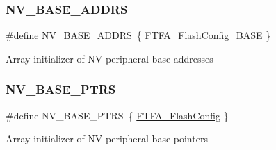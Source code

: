 \subsubsection{\texorpdfstring{NV\_BASE\_ADDRS}{NV\_BASE\_ADDRS}}
{\footnotesize\ttfamily \#define N\+V\+\_\+\+B\+A\+S\+E\+\_\+\+A\+D\+D\+RS~\{ \mbox{\hyperlink{group___n_v___peripheral___access___layer_ga1e6dbd99b75dd6c501dddbdbc8141ea7}{F\+T\+F\+A\+\_\+\+Flash\+Config\+\_\+\+B\+A\+SE}} \}}

Array initializer of NV peripheral base addresses \mbox{\label{group___n_v___peripheral___access___layer_ga1e44e66a8945b675dcebb6fbd6bdc85b}} 
\subsubsection{\texorpdfstring{NV\_BASE\_PTRS}{NV\_BASE\_PTRS}}
{\footnotesize\ttfamily \#define N\+V\+\_\+\+B\+A\+S\+E\+\_\+\+P\+T\+RS~\{ \mbox{\hyperlink{group___n_v___peripheral___access___layer_gaf75019f28fbe0be805db316ab76bda45}{F\+T\+F\+A\+\_\+\+Flash\+Config}} \}}

Array initializer of NV peripheral base pointers 